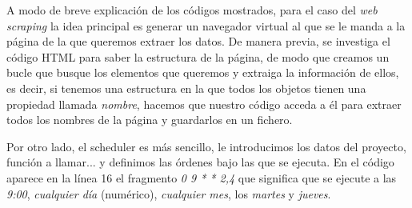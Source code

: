A modo de breve explicación de los códigos mostrados, para el caso del \textit{web scraping} la idea principal es generar un navegador virtual al que se le manda a la página de la que queremos extraer los datos. De manera previa, se investiga el código HTML para saber la estructura de la página, de modo que creamos un bucle que busque los elementos que queremos y extraiga la información de ellos, es decir, si tenemos una estructura en la que todos los objetos tienen una propiedad llamada \textit{nombre}, hacemos que nuestro código acceda a él para extraer todos los nombres de la página y guardarlos en un fichero.

Por otro lado, el scheduler es más sencillo, le introducimos los datos del proyecto, función a llamar... y definimos las órdenes bajo las que se ejecuta. En el código aparece en la línea 16 el fragmento \textit{0 9 * * 2,4} que significa que se ejecute a las \textit{9:00}, \textit{cualquier día} (numérico), \textit{cualquier mes}, los \textit{martes} y \textit{jueves}.
%
%
